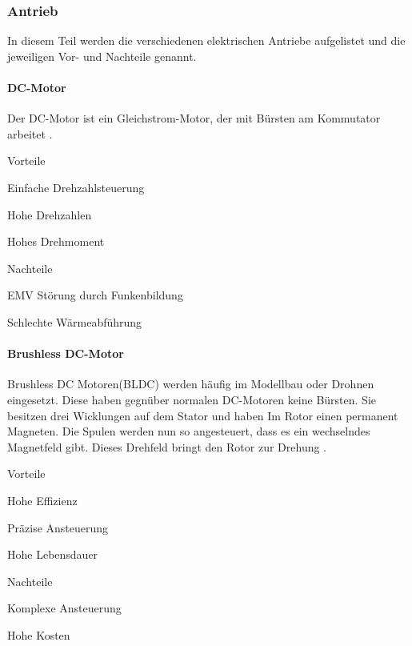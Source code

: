 \documentclass[../main.tex]{subfiles}
\begin{document}
\subsubsection{Antrieb}

In diesem Teil werden die verschiedenen elektrischen Antriebe aufgelistet und die jeweiligen Vor- und Nachteile genannt. 

\paragraph{DC-Motor}

Der DC-Motor ist ein Gleichstrom-Motor, der mit Bürsten am Kommutator arbeitet \cite{dc_motor}. 

\begin{minipage}[t]{0.48\textwidth}
\begin{items}
  \item [Vorteile]
  \item Einfache Drehzahlsteuerung
  \item Hohe Drehzahlen
  \item Hohes Drehmoment
\end{items}
\end{minipage}
\hfill
\begin{minipage}[t]{0.48\textwidth}
\begin{items}
  \item [Nachteile]
  \item EMV Störung durch Funkenbildung
  \item Schlechte Wärmeabführung
\end{items}
\end{minipage}

\paragraph{Brushless DC-Motor}

Brushless DC Motoren(BLDC) werden häufig im Modellbau oder Drohnen eingesetzt. Diese haben gegnüber normalen DC-Motoren keine Bürsten. Sie besitzen drei Wicklungen auf dem Stator und haben Im Rotor einen permanent Magneten. Die Spulen werden nun so angesteuert, dass es ein wechselndes Magnetfeld gibt. Dieses Drehfeld bringt den Rotor zur Drehung \cite{brushless}. 

\begin{minipage}[t]{0.48\textwidth}
\begin{items}
  \item [Vorteile]
  \item Hohe Effizienz
  \item Präzise Ansteuerung
  \item Hohe Lebensdauer
\end{items}
\end{minipage}
\hfill
\begin{minipage}[t]{0.48\textwidth}
\begin{items}
  \item [Nachteile]
  \item Komplexe Ansteuerung
  \item Hohe Kosten
\end{items}
\end{minipage}
\end{document}
